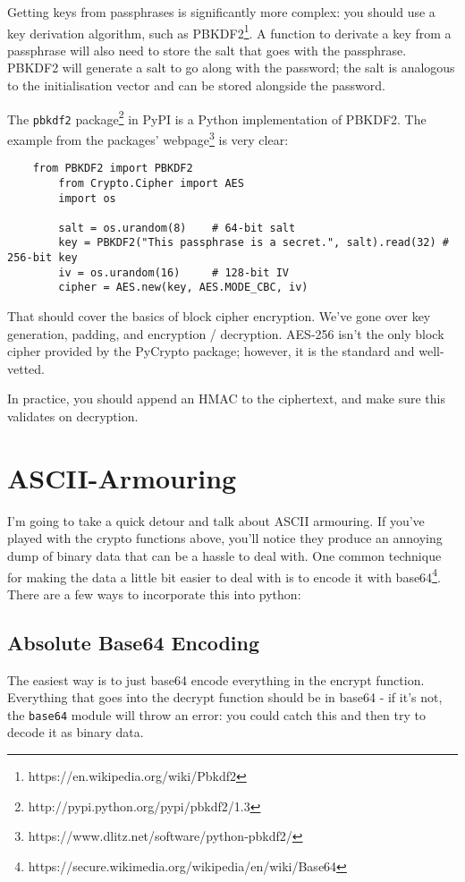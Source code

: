 \documentclass[letterpaper,10pt]{article}
\begin{document}
Getting keys from passphrases is significantly more complex: you
should use a key derivation algorithm, such as
PBKDF2\footnote{https://en.wikipedia.org/wiki/Pbkdf2}. A function to
derivate a key from a passphrase will also need to store the salt that
goes with the passphrase. PBKDF2 will generate a salt to go along with
the password; the salt is analogous to the initialisation vector and
can be stored alongside the password.

The \verb|pbkdf2| package\footnote{http://pypi.python.org/pypi/pbkdf2/1.3}
in PyPI is a Python implementation of PBKDF2. The example from the packages'
webpage\footnote{https://www.dlitz.net/software/python-pbkdf2/}
is very clear:

\begin{verbatim}
    from PBKDF2 import PBKDF2
        from Crypto.Cipher import AES
        import os
    
        salt = os.urandom(8)    # 64-bit salt
        key = PBKDF2("This passphrase is a secret.", salt).read(32) # 256-bit key
        iv = os.urandom(16)     # 128-bit IV
        cipher = AES.new(key, AES.MODE_CBC, iv)
\end{verbatim}

That should cover the basics of block cipher encryption. We've gone over key
generation, padding, and encryption / decryption. AES-256 isn't the only 
block cipher provided by the PyCrypto package; however, it is the standard
and well-vetted. 

In practice, you should append an HMAC to the ciphertext, and make sure this
validates on decryption.

\section{ASCII-Armouring}
I'm going to take a quick detour and talk about ASCII armouring. If you've 
played with the crypto functions above, you'll notice they produce an annoying
dump of binary data that can be a hassle to deal with. One common technique for
making the data a little bit easier to deal with is to encode it with 
base64\footnote{https://secure.wikimedia.org/wikipedia/en/wiki/Base64}. There
are a few ways to incorporate this into python:
\subsection{Absolute Base64 Encoding}
The easiest way is to just base64 encode everything in the encrypt function. 
Everything that goes into the decrypt function should be in base64 - if it's 
not, the \verb|base64| module will throw an error: you could catch this and 
then try to decode it as binary data.
\end{document}
